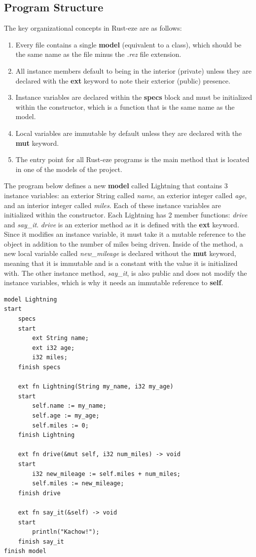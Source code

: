 \documentclass[letterpaper, 10pt, DIV=13]{scrartcl}
\numberwithin{equation}{section}
\numberwithin{figure}{section}
\numberwithin{table}{section}
\begin{document}
\subsection{Program Structure}
The key organizational concepts in Rust-eze are as follows:
\begin{enumerate}
    \item Every file contains a single \textbf{model} (equivalent to a class),
          which should be the same name as the file minus the \textit{.rez} file
          extension.
      \item All instance members default to being in the interior (private) unless they 
          are declared with the \textbf{ext} keyword to note their exterior (public) presence.
    \item Instance variables are declared within the \textbf{specs} block and
          must be initialized within the constructor, which is a function that
          is the same name as the model.
    \item Local variables are immutable by default unless they are declared with
          the \textbf{mut} keyword.
    \item The entry point for all Rust-eze programs is the main method that is
          located in one of the models of the project.
\end{enumerate}

The program below defines a new \textbf{model} called Lightning that contains
3 instance variables: an exterior String called \textit{name}, an exterior
integer called \textit{age}, and an interior integer called \textit{miles}. Each
of these instance variables are initialized within the constructor. Each
Lightning has 2 member functions: \textit{drive} and \textit{say\_it}.
\textit{drive} is an exterior method as it is defined with the \textbf{ext}
keyword. Since it modifies an instance variable, it must take it a mutable
reference to the object in addition to the number of miles being driven. Inside
of the method, a new local variable called \textit{new\_mileage} is declared
without the \textbf{mut} keyword, meaning that it is immutable and is a constant
with the value it is initialized with. The other instance method,
\textit{say\_it}, is also public and does not modify the instance variables,
which is why it needs an immutable reference to \textbf{self}.

\begin{lstlisting}[caption = Lightning.rez, frame = single, nolol]
model Lightning
start
    specs
    start
        ext String name;
        ext i32 age;
        i32 miles;
    finish specs

    ext fn Lightning(String my_name, i32 my_age)
    start
        self.name := my_name;
        self.age := my_age;
        self.miles := 0;
    finish Lightning

    ext fn drive(&mut self, i32 num_miles) -> void
    start
        i32 new_mileage := self.miles + num_miles;
        self.miles := new_mileage;
    finish drive

    ext fn say_it(&self) -> void
    start
        println("Kachow!");
    finish say_it
finish model
\end{lstlisting}
\end{document}
